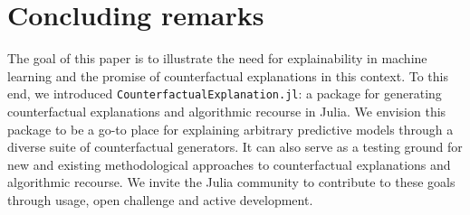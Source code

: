 \documentclass[
  letterpaper,
  DIV=11,
  numbers=noendperiod]{scrartcl}
\begin{document}
\hypertarget{sec-conclude}{%
\section{Concluding remarks}\label{sec-conclude}}

The goal of this paper is to illustrate the need for explainability in
machine learning and the promise of counterfactual explanations in this
context. To this end, we introduced
\texttt{CounterfactualExplanation.jl}: a package for generating
counterfactual explanations and algorithmic recourse in Julia. We
envision this package to be a go-to place for explaining arbitrary
predictive models through a diverse suite of counterfactual generators.
It can also serve as a testing ground for new and existing
methodological approaches to counterfactual explanations and algorithmic
recourse. We invite the Julia community to contribute to these goals
through usage, open challenge and active development.
\end{document}
